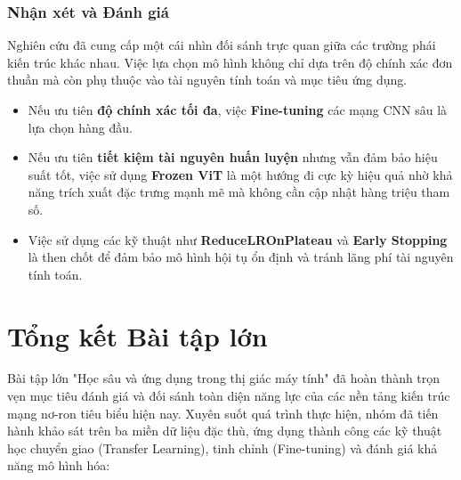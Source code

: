 \documentclass[a4paper]{article}
\theoremstyle{definition}
\begin{document}
\subsubsection{Nhận xét và Đánh giá}

Nghiên cứu đã cung cấp một cái nhìn đối sánh trực quan giữa các trường phái kiến trúc khác nhau. Việc lựa chọn mô hình không chỉ dựa trên độ chính xác đơn thuần mà còn phụ thuộc vào tài nguyên tính toán và mục tiêu ứng dụng.

\begin{itemize}
	\item Nếu ưu tiên \textbf{độ chính xác tối đa}, việc \textbf{Fine-tuning} các mạng CNN sâu là lựa chọn hàng đầu.
	\item Nếu ưu tiên \textbf{tiết kiệm tài nguyên huấn luyện} nhưng vẫn đảm bảo hiệu suất tốt, việc sử dụng \textbf{Frozen ViT} là một hướng đi cực kỳ hiệu quả nhờ khả năng trích xuất đặc trưng mạnh mẽ mà không cần cập nhật hàng triệu tham số.
	\item Việc sử dụng các kỹ thuật như \textbf{ReduceLROnPlateau} và \textbf{Early Stopping} là then chốt để đảm bảo mô hình hội tụ ổn định và tránh lãng phí tài nguyên tính toán.
\end{itemize}




\section{Tổng kết Bài tập lớn}
Bài tập lớn "Học sâu và ứng dụng trong thị giác máy tính" đã hoàn thành trọn vẹn mục tiêu đánh giá và đối sánh toàn diện năng lực của các nền tảng kiến trúc mạng nơ-ron tiêu biểu hiện nay. Xuyên suốt quá trình thực hiện, nhóm đã tiến hành khảo sát trên ba miền dữ liệu đặc thù, ứng dụng thành công các kỹ thuật học chuyển giao (Transfer Learning), tinh chỉnh (Fine-tuning) và đánh giá khả năng mô hình hóa:
\end{document}
